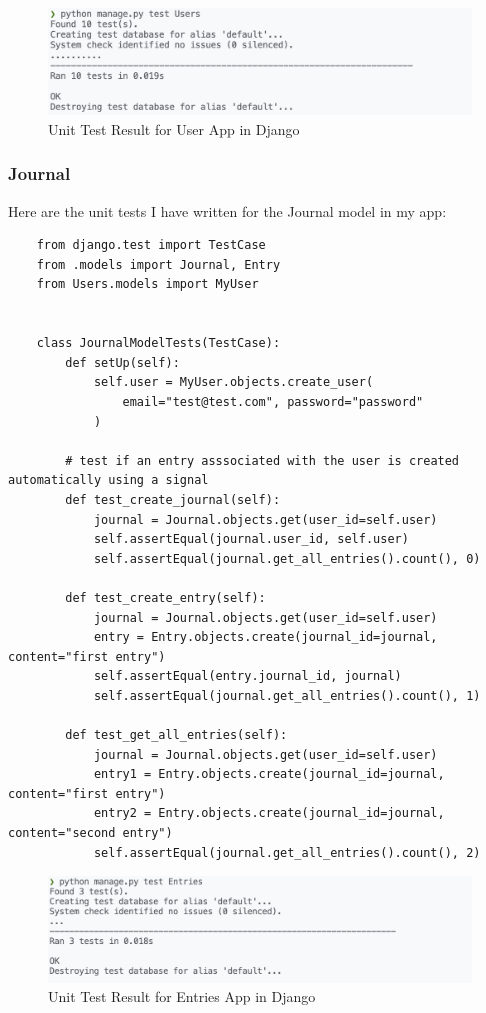 \begin{figure}[H]
    \centering
    \includegraphics[width=\textwidth]{Assets/users_test_result.png}
    \caption{Unit Test Result for User App in Django}
    \label{fig:unit_test_user}
\end{figure}


\subsubsection{Journal}
Here are the unit tests I have written for the Journal model in my app:

\begin{verbatim}
    from django.test import TestCase
    from .models import Journal, Entry
    from Users.models import MyUser
    
    
    class JournalModelTests(TestCase):
        def setUp(self):
            self.user = MyUser.objects.create_user(
                email="test@test.com", password="password"
            )
    
        # test if an entry asssociated with the user is created automatically using a signal
        def test_create_journal(self):
            journal = Journal.objects.get(user_id=self.user)
            self.assertEqual(journal.user_id, self.user)
            self.assertEqual(journal.get_all_entries().count(), 0)
    
        def test_create_entry(self):
            journal = Journal.objects.get(user_id=self.user)
            entry = Entry.objects.create(journal_id=journal, content="first entry")
            self.assertEqual(entry.journal_id, journal)
            self.assertEqual(journal.get_all_entries().count(), 1)
    
        def test_get_all_entries(self):
            journal = Journal.objects.get(user_id=self.user)
            entry1 = Entry.objects.create(journal_id=journal, content="first entry")
            entry2 = Entry.objects.create(journal_id=journal, content="second entry")
            self.assertEqual(journal.get_all_entries().count(), 2)
\end{verbatim}

\begin{figure}[H]
    \centering
    \includegraphics[width=\textwidth]{Assets/entries_test_result.png}
    \caption{Unit Test Result for Entries App in Django}
    \label{fig:unit_test_entries}
\end{figure}

